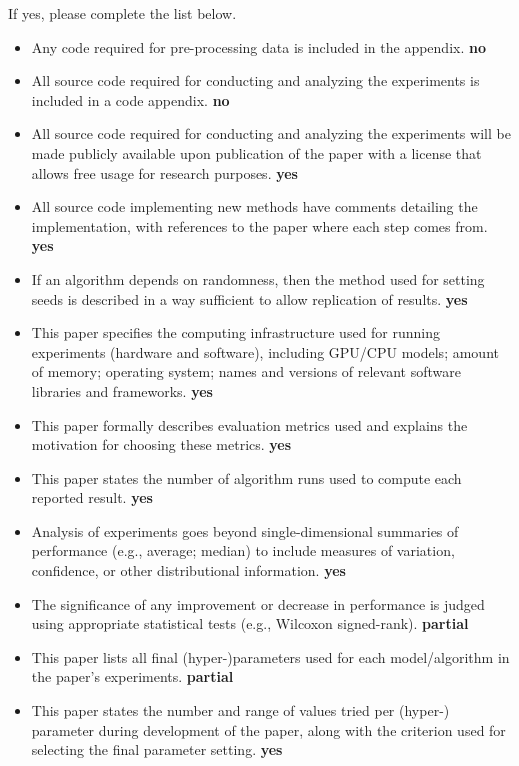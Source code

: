 If yes, please complete the list below.
\begin{itemize}
\item Any code required for pre-processing data is included in the appendix. {\bf no}
\item All source code required for conducting and analyzing the experiments is included in a code appendix. {\bf no}
\item All source code required for conducting and analyzing the experiments will be made publicly available upon publication of the paper with a license that allows free usage for research purposes. {\bf yes}
\item All source code implementing new methods have comments detailing the implementation, with references to the paper where each step comes from. {\bf yes}
\item If an algorithm depends on randomness, then the method used for setting seeds is described in a way sufficient to allow replication of results. {\bf yes}
\item This paper specifies the computing infrastructure used for running experiments (hardware and software), including GPU/CPU models; amount of memory; operating system; names and versions of relevant software libraries and frameworks. {\bf yes}
\item This paper formally describes evaluation metrics used and explains the motivation for choosing these metrics. {\bf yes}
\item This paper states the number of algorithm runs used to compute each reported result. {\bf yes}
\item Analysis of experiments goes beyond single-dimensional summaries of performance (e.g., average; median) to include measures of variation, confidence, or other distributional information. {\bf yes}
\item The significance of any improvement or decrease in performance is judged using appropriate statistical tests (e.g., Wilcoxon signed-rank). {\bf partial}
\item This paper lists all final (hyper-)parameters used for each model/algorithm in the paper’s experiments. {\bf partial}
\item This paper states the number and range of values tried per (hyper-) parameter during development of the paper, along with the criterion used for selecting the final parameter setting. {\bf yes}
\end{itemize}